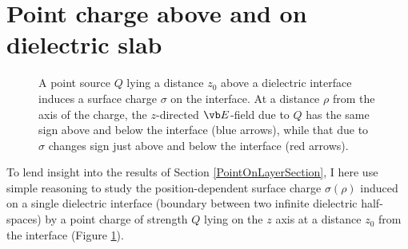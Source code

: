 \documentclass[letterpaper]{article}
\begin{document}
\section{Point charge above and on dielectric slab}
\label{PointChargeAboveSlabSection}
\begin{figure}[H]
\begin{center}
\caption{A point source $Q$ lying a distance $z_0$ above a dielectric
         interface induces a surface charge $\sigma$ on the interface.
         At a distance $\rho$ from the axis of the charge,
         the $z$-directed $\vb E$-field due to $Q$ has the same sign 
         above and below the interface (blue arrows), while that due to
         $\sigma$ changes sign just above and below the interface (red arrows).
        }
\label{PointChargeAboveSlabFigure}
\end{center}
\end{figure}

To lend insight into the results of Section \ref{PointOnLayerSection},
I here use simple reasoning to study the position-dependent
surface charge $\sigma(\rho)$
induced on a single dielectric interface (boundary
between two infinite dielectric half-spaces)
by a point charge of strength $Q$ lying on the $z$ axis
at a distance $z_0$ from the interface 
(Figure \ref{PointChargeAboveSlabFigure}).
\end{document}
